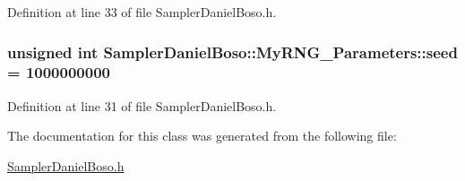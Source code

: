 Definition at line 33 of file Sampler\-Daniel\-Boso.\-h.

\hypertarget{class_sampler_daniel_boso_1_1_my_r_n_g___parameters_ac0f1bd1a3e22703473e781865e57ac51}{
\subsubsection[{seed}]{\setlength{\rightskip}{0pt plus 5cm}unsigned int Sampler\-Daniel\-Boso\-::\-My\-R\-N\-G\-\_\-\-Parameters\-::seed = 1000000000}}\label{class_sampler_daniel_boso_1_1_my_r_n_g___parameters_ac0f1bd1a3e22703473e781865e57ac51}


Definition at line 31 of file Sampler\-Daniel\-Boso.\-h.



The documentation for this class was generated from the following file\-:\begin{DoxyCompactItemize}
\item 
\hyperlink{_sampler_daniel_boso_8h}{Sampler\-Daniel\-Boso.\-h}\end{DoxyCompactItemize}
